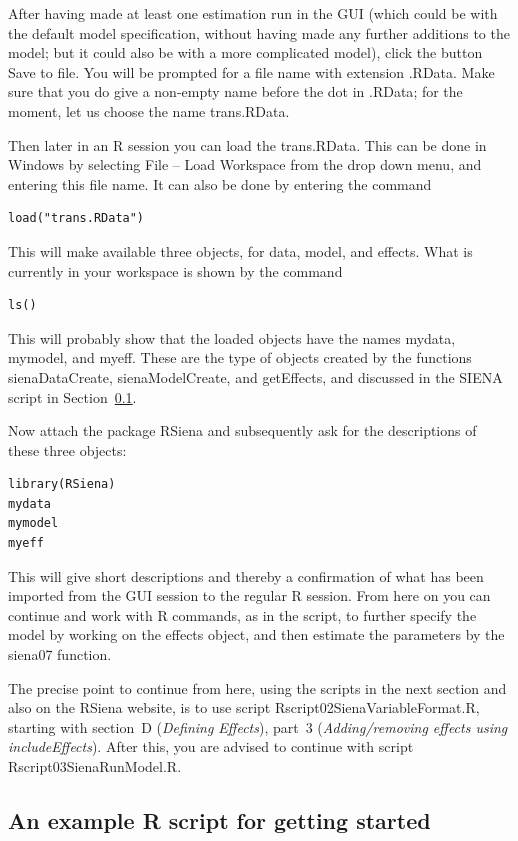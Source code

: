 \documentclass[a4paper,fleqn,11pt]{article}
\newcommand{\+}{\, + \,}
\newcommand{\sfn}[1]{\textsf{#1}}
\newcommand{\R}{{\sf R }}
\newcommand{\RS}{{\sf RSiena }}
\newcommand{\SI}{{\sf SIENA }}
\begin{document}
{After having made at least one estimation run
in the GUI (which could be with the default
model specification, without having made any further additions to the model;
but it could also be with a more complicated model), click the button
\sfn{Save to file}. You will be prompted for a file name with extension \sfn{.RData}.
Make sure that you do give a non-empty name before the dot in \sfn{.RData};
for the moment, let us choose the name  \sfn{trans.RData}.

Then later in an \R session you can load the  \sfn{trans.RData}.
This can be done in Windows by selecting \sfn{File -- Load Workspace} from the drop down
menu, and entering this file name. It can also be done by entering the command
\begin{verbatim}
load("trans.RData")
\end{verbatim}
This will make available three objects, for data, model, and effects.
What is currently in your workspace is shown by the command
\begin{verbatim}
ls()
\end{verbatim}
This will probably show that the loaded objects have the names
\sfn{mydata}, \sfn{mymodel}, and \sfn{myeff}.
These are the type of objects created by the functions \sfn{sienaDataCreate},
\sfn{sienaModelCreate}, and \sfn{getEffects},
and discussed in the \SI script in Section~\ref{S_Rscript}.

Now attach the package \RS and subsequently ask for the descriptions of these
three objects:
\begin{verbatim}
library(RSiena)
mydata
mymodel
myeff
\end{verbatim}
This will give short descriptions and thereby a confirmation of what has been
imported from the GUI session to the regular \R session.
From here on you can continue and work with \R commands,
as in the script, to further specify the model by working
on the effects object, and then estimate the parameters by the \sfn{siena07}
function.

The precise point to continue from here, using the scripts
in the next section and also on the \RS website,
is to use
script \sfn{Rscript02SienaVariableFormat.R},
starting with section~D (\emph{Defining Effects}),
part~3 (\emph{Adding/removing effects using includeEffects}).
After this, you are advised to continue with script
\sfn{Rscript03SienaRunModel.R}.


\subsection{An example \R script for getting started}
\label{S_Rscript}

}
\end{document}
